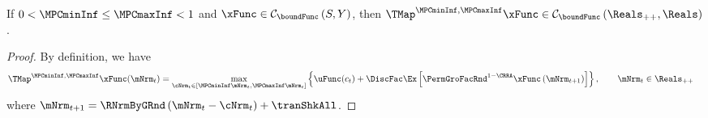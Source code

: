 \documentclass[\econtexRoot/BufferStockTheory]{subfiles}
\begin{document}
\begin{claim}\label{clm:hiraguchi_cont}
If $0<\MPCminInf\leq\MPCmaxInf<1$ and $\xFunc\in  \mathcal{C}_{\boundFunc }\left( S,Y\right)$, then $\TMap^{\MPCminInf, \MPCmaxInf}{\mathfrak{\xFunc}}\in \mathcal{C}_{\boundFunc }\left(\Reals_{++}, \Reals\right)$.
\end{claim}
%
\begin{proof}
By definition, we have
%
\begin{equation}\begin{gathered}\begin{aligned}
  \TMap^{\MPCminInf, \MPCmaxInf}{\mathfrak{\xFunc}}(\mNrm_{t}) & = \underset{\cNrm_{t} \in
                                            [\MPCminInf \mNrm_{t}, \MPCmaxInf \mNrm_{t}]
                                            }\max \left\{
                                            \uFunc(c_{t})+\DiscFac \Ex\left[ {\PermGroFacRnd}^{1-\CRRA }{\mathfrak{\xFunc}}
                                            \left( {\mNrm}_{t+1}\right) \right] \right\}, \qquad \mNrm_{t}\in \Reals_{++}  %
\end{aligned}\end{gathered}\end{equation}
%
where ${\mNrm}_{t+1} = \RNrmByGRnd\left(\mNrm_{t} - \cNrm_{t}\right) + \tranShkAll$.


\end{proof}
\end{document}
